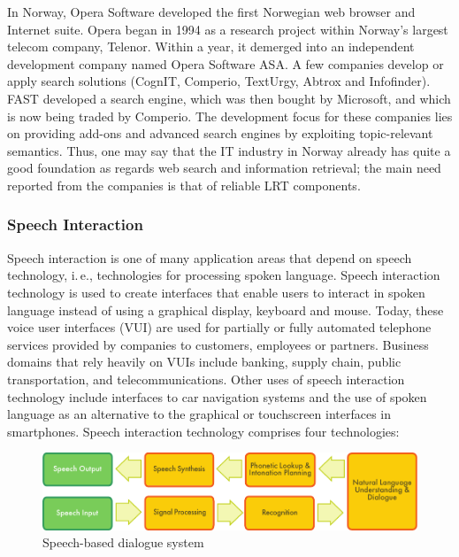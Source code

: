 \begin{multicols}{2}
In Norway, Opera Software developed the first Norwegian web browser and Internet suite.
Opera began in 1994 as a research project within Norway’s largest telecom company, Telenor. 
Within a year, it demerged into an independent development company named Opera Software ASA.
A few companies develop or apply search solutions (CognIT, Comperio, TextUrgy, Abtrox and Infofinder). 
FAST developed a search engine, which was then bought by Microsoft, and which is now being traded by Comperio. 
The development focus for these companies lies on providing add-ons and advanced search engines by exploiting topic-relevant semantics. 
Thus, one may say that the IT industry in Norway already has quite a good foundation as regards web search and information retrieval; the main need reported from the companies is that of reliable LRT components.

\subsubsection{Speech Interaction}

Speech interaction is one of many application areas that depend on speech technology, i.\,e., technologies for processing spoken language. Speech interaction technology is used to create interfaces that enable users to interact in spoken language instead of using a graphical display, keyboard and mouse.  Today, these voice user interfaces (VUI) are used for partially or fully automated telephone services provided by companies to customers, employees or partners. Business domains that rely heavily on VUIs include banking, supply chain, public transportation, and telecommunications. Other uses of speech interaction technology include interfaces to car navigation systems and the use of spoken language as an alternative to the graphical or touchscreen interfaces in smartphones. 
Speech interaction technology comprises four technologies: 

\begin{figure}[htb]
  \center
  \includegraphics[width=\textwidth]{../_media/english/simple_speech-based_dialogue_architecture}
  \caption{Speech-based dialogue system}
  \label{fig:dialoguearch_en}
\end{figure}


\end{multicols}
